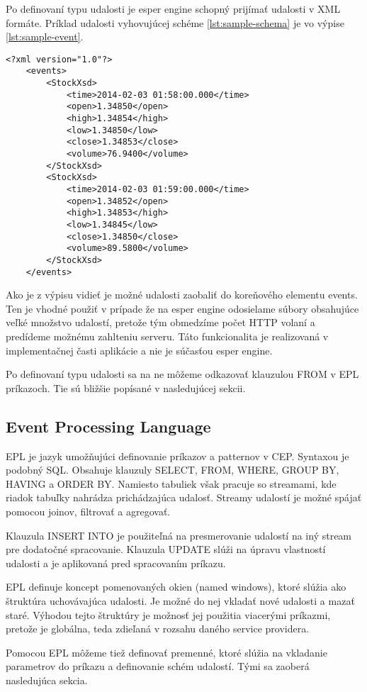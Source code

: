 	Po definovaní typu udalosti je esper engine schopný prijímať udalosti v XML formáte. Príklad udalosti vyhovujúcej schéme \ref{lst:sample-schema} je vo výpise \ref{lst:sample-event}.
	\begin{lstlisting}[label=lst:sample-schema,caption=Príklad XML udalosti]
	<?xml version="1.0"?>
	<events>
		<StockXsd>
			<time>2014-02-03 01:58:00.000</time>
			<open>1.34850</open>
			<high>1.34854</high>
			<low>1.34850</low>
			<close>1.34853</close>
			<volume>76.9400</volume>
		</StockXsd>
		<StockXsd>
			<time>2014-02-03 01:59:00.000</time>
			<open>1.34852</open>
			<high>1.34853</high>
			<low>1.34845</low>
			<close>1.34850</close>
			<volume>89.5800</volume>
		</StockXsd>
	</events>
	\end{lstlisting}
	Ako je z výpisu vidieť je možné udalosti zaobaliť do koreňového elementu events. Ten je vhodné použiť v prípade že na esper engine odosielame súbory obsahujúce veľké množstvo udalostí, pretože tým obmedzíme počet HTTP volaní a predídeme možnému zahlteniu serveru. Táto funkcionalita je realizovaná v implementačnej časti aplikácie a nie je súčasťou esper engine.

	Po definovaní typu udalosti sa na ne môžeme odkazovať klauzulou FROM v EPL príkazoch. Tie sú bližšie popísané v nasledujúcej sekcii.

	\subsection{Event Processing Language}
		\ac{EPL} je jazyk umožňujúci definovanie príkazov a patternov v CEP. Syntaxou je podobný SQL. Obsahuje klauzuly SELECT, FROM, WHERE, GROUP BY, HAVING a ORDER BY. Namiesto tabuliek však pracuje so streamami, kde riadok tabuľky nahrádza prichádzajúca udalosť. Streamy udalostí je možné spájať pomocou joinov, filtrovať a agregovať.
		
		Klauzula INSERT INTO je použiteľná na presmerovanie udalostí na iný stream pre dodatočné spracovanie. Klauzula UPDATE slúži na úpravu vlastností udalosti a je aplikovaná pred spracovaním príkazu. 
		
		EPL definuje koncept pomenovaných okien (named windows), ktoré slúžia ako štruktúra uchovávajúca udalosti. Je možné do nej vkladať nové udalosti a mazať staré. Výhodou tejto štruktúry je možnosť jej použitia viacerými príkazmi, pretože je globálna, teda zdieľaná v rozsahu daného service providera.	
		
		Pomocou EPL môžeme tiež definovať premenné, ktoré slúžia na vkladanie parametrov do príkazu a definovanie schém udalostí. Tými sa zaoberá nasledujúca sekcia.
		
